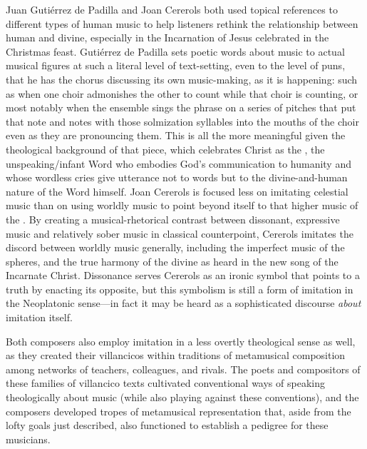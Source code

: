 Juan Gutiérrez de Padilla and Joan Cererols both used topical references to
different types of human music to help listeners rethink the relationship
between human and divine, especially in the Incarnation of Jesus celebrated in
the Christmas feast.
Gutiérrez de Padilla sets poetic words about music to actual musical figures at
such a literal level of text-setting, even to the level of puns, that he has the
chorus discussing its own music-making, as it is happening: such as when one
choir admonishes the other to count while that choir is counting, or most
notably when the ensemble sings the phrase  on a series of
pitches that put that note and notes with those solmization syllables into the
mouths of the choir even as they are pronouncing them.
This is all the more meaningful given the theological background of that piece,
which celebrates Christ as the , the unspeaking/infant Word
who embodies God's communication to humanity and whose wordless cries give
utterance not to words but to the divine-and-human nature of the Word himself.
Joan Cererols is focused less on imitating celestial music than on using worldly
music to point beyond itself to that higher music of the .
By creating a musical-rhetorical contrast between dissonant, expressive music
and relatively sober music in classical counterpoint, Cererols imitates the
discord between worldly music generally, including the imperfect music of the
spheres, and the true harmony of the divine as heard in the new song of the
Incarnate Christ.
Dissonance serves Cererols as an ironic symbol that points to a truth by
enacting its opposite, but this symbolism is still a form of imitation in the
Neoplatonic sense---in fact it may be heard as a sophisticated discourse
\emph{about} imitation itself.

Both composers also employ imitation in a less overtly theological sense as
well, as they created their villancicos within traditions of metamusical
composition among networks of teachers, colleagues, and rivals. 
The poets and compositors of these families of villancico texts cultivated
conventional ways of speaking theologically about music (while also playing
against these conventions), and the composers developed tropes of metamusical
representation that, aside from the lofty goals just described, also functioned
to establish a pedigree for these musicians.

